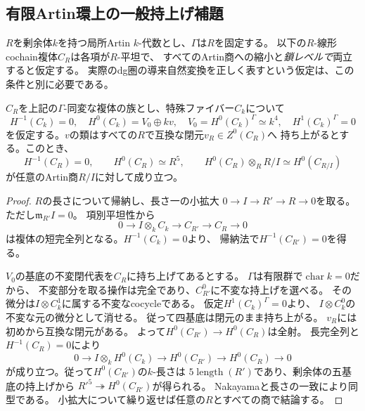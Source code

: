 \subsection{有限Artin環上の一般持上げ補題}
$R$を剰余体$k$を持つ局所Artin $k$-代数とし、$\Gamma$は$R$を固定する。
以下の$R$-線形cochain複体$C_R$は各項が$R$-平坦で、
すべてのArtin商への縮小と\emph{鎖レベルで}両立すると仮定する。
実際のdg圏の導来自然変換を正しく表すという仮定は、この条件と別に必要である。

\begin{lemma}[対称性と一つの恒等的閉元による全Artin自由性]
\label{csl:lem:equivariant-lift}
$C_R$を上記の$\Gamma$-同変な複体の族とし、特殊ファイバー$C_k$について
\[
 H^{-1}(C_k)=0,\quad H^0(C_k)=V_0\oplus kv,
 \quad V_0=H^0(C_k)^\Gamma\simeq k^4,
 \quad H^1(C_k)^\Gamma=0
\]
を仮定する。$v$の類はすべての$R$で互換な閉元$v_R\in Z^0(C_R)$へ
持ち上がるとする。このとき、
\[
 H^{-1}(C_R)=0,\qquad H^0(C_R)\simeq R^5,
 \qquad H^0(C_R)\otimes_R R/I\simeq H^0(C_{R/I})
 \tag{CSL2}\label{csl:eq:artin-free}
\]
が任意のArtin商$R/I$に対して成り立つ。
\end{lemma}
\begin{proof}
$R$の長さについて帰納し、長さ一の小拡大
$0\to I\to R'\to R\to0$を取る。ただし$\mathfrak m_{R'}I=0$。
項別平坦性から
\[
 0\to I\otimes_k C_k\to C_{R'}\to C_R\to0
\]
は複体の短完全列となる。$H^{-1}(C_k)=0$より、
帰納法で$H^{-1}(C_{R'})=0$を得る。

$V_0$の基底の不変閉代表を$C_R$に持ち上げてあるとする。
$\Gamma$は有限群で$\operatorname{char}k=0$だから、
不変部分を取る操作は完全であり、$C_{R'}^0$に不変な持上げを選べる。
その微分は$I\otimes C_k^1$に属する不変なcocycleである。
仮定$H^1(C_k)^\Gamma=0$より、
$I\otimes C_k^0$の不変な元の微分として消せる。
従って四基底は閉元のまま持ち上がる。
$v_R$には初めから互換な閉元がある。
よって$H^0(C_{R'})\to H^0(C_R)$は全射。
長完全列と$H^{-1}(C_R)=0$により
\[
 0\to I\otimes_k H^0(C_k)\to H^0(C_{R'})
 \to H^0(C_R)\to0
\]
が成り立つ。従って$H^0(C_{R'})$の$k$-長さは
$5\operatorname{length}(R')$であり、剰余体の五基底の持上げから
$R'^5\twoheadrightarrow H^0(C_{R'})$が得られる。
Nakayamaと長さの一致により同型である。
小拡大について繰り返せば任意の$R$とすべての商で結論する。
\end{proof}

